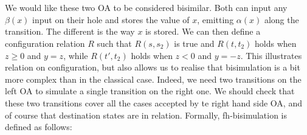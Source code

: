 \documentclass[runningheads]{llncs}
\begin{document}
\noindent~
\hfill
{}~

We would like these two OA to be considered bisimilar. Both can input any $\beta(x)$ input on their hole and stores the value of $x$, emitting $\alpha(x)$ along the transition.
The different is the way $x$ is stored. We can then define a configuration relation $R$ such that $R(s,s_2)$ is true and $R(t,t_2)$ holds when $z\geq 0$ and $y=z$, while $R(t',t_2)$ holds when $z< 0$ and $y=-z$. This illustrates relation on configuration, but also allows us to realise that bisimulation is a bit more complex than in the classical case. Indeed, we need two transitions on the left OA to simulate a single transition on the right one. We should check that these two transitions cover all the cases accepted by te right hand side OA, and of course that destination states are in relation. Formally, fh-bisimulation is defined \cite{fhbisim} as follows:
\end{document}
